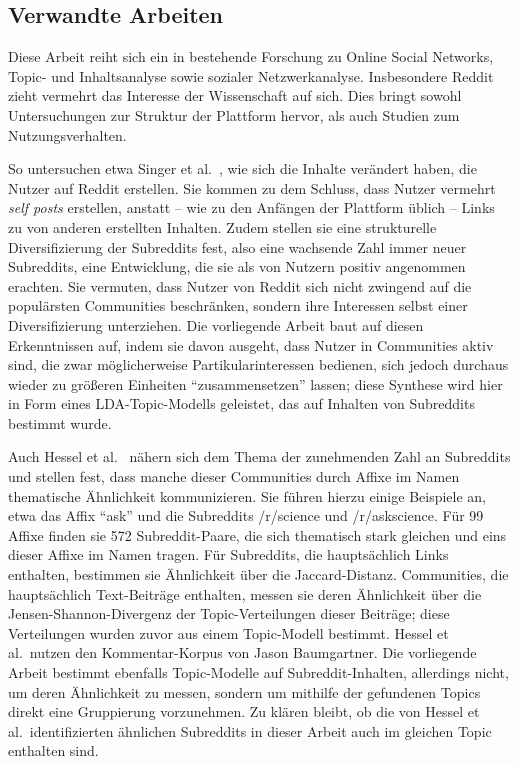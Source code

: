 \documentclass[11pt,a4paper,twoside]{article}
\begin{document}
\hypertarget{relatedwork}{%
\subsection{Verwandte Arbeiten}\label{relatedwork}}

Diese Arbeit reiht sich ein in bestehende Forschung zu Online Social
Networks, Topic- und Inhaltsanalyse sowie sozialer Netzwerkanalyse.
Insbesondere Reddit zieht vermehrt das Interesse der Wissenschaft auf
sich. Dies bringt sowohl Untersuchungen zur Struktur der Plattform
hervor, als auch Studien zum Nutzungsverhalten.

So untersuchen etwa Singer et al.~\autocite{Singer2014}, wie sich die
Inhalte verändert haben, die Nutzer auf Reddit erstellen. Sie kommen zu
dem Schluss, dass Nutzer vermehrt \emph{self posts} erstellen, anstatt
-- wie zu den Anfängen der Plattform üblich -- Links zu von anderen
erstellten Inhalten. Zudem stellen sie eine strukturelle
Diversifizierung der Subreddits fest, also eine wachsende Zahl immer
neuer Subreddits, eine Entwicklung, die sie als von Nutzern positiv
angenommen erachten. Sie vermuten, dass Nutzer von Reddit sich nicht
zwingend auf die populärsten Communities beschränken, sondern ihre
Interessen selbst einer Diversifizierung unterziehen. Die vorliegende
Arbeit baut auf diesen Erkenntnissen auf, indem sie davon ausgeht, dass
Nutzer in Communities aktiv sind, die zwar möglicherweise
Partikularinteressen bedienen, sich jedoch durchaus wieder zu größeren
Einheiten \enquote{zusammensetzen} lassen; diese Synthese wird hier in
Form eines LDA-Topic-Modells geleistet, das auf Inhalten von Subreddits
bestimmt wurde.

Auch Hessel et al.~\autocite{Hessel2016} nähern sich dem Thema der
zunehmenden Zahl an Subreddits und stellen fest, dass manche dieser
Communities durch Affixe im Namen thematische Ähnlichkeit kommunizieren.
Sie führen hierzu einige Beispiele an, etwa das Affix \enquote{ask} und
die Subreddits /r/science und /r/askscience. Für 99 Affixe finden sie
572 Subreddit-Paare, die sich thematisch stark gleichen und eins dieser
Affixe im Namen tragen. Für Subreddits, die hauptsächlich Links
enthalten, bestimmen sie Ähnlichkeit über die Jaccard-Distanz.
Communities, die hauptsächlich Text-Beiträge enthalten, messen sie deren
Ähnlichkeit über die Jensen-Shannon-Divergenz der Topic-Verteilungen
dieser Beiträge; diese Verteilungen wurden zuvor aus einem Topic-Modell
bestimmt. Hessel et al.~nutzen den Kommentar-Korpus von Jason
Baumgartner. Die vorliegende Arbeit bestimmt ebenfalls Topic-Modelle auf
Subreddit-Inhalten, allerdings nicht, um deren Ähnlichkeit zu messen,
sondern um mithilfe der gefundenen Topics direkt eine Gruppierung
vorzunehmen. Zu klären bleibt, ob die von Hessel et al.~identifizierten
ähnlichen Subreddits in dieser Arbeit auch im gleichen Topic enthalten
sind.
\end{document}
